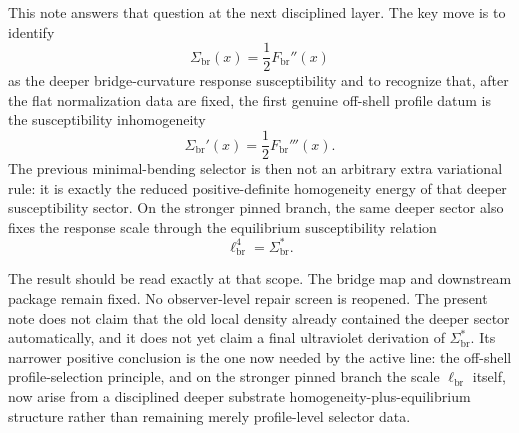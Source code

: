 \documentclass[11pt]{article}
\newcommand{\CurvScale}{\ell_{\mathrm{br}}}
\newcommand{\CurvProfile}{F_{\mathrm{br}}}
\newcommand{\RespSus}{\Sigma_{\mathrm{br}}}
\newcommand{\RespSusEq}{\Sigma_{\mathrm{br}}^{\ast}}
\begin{document}
This note answers that question at the next disciplined layer. The key move is to identify
\[
\RespSus(x)=\frac12\CurvProfile''(x)
\]
as the deeper bridge-curvature response susceptibility and to recognize that, after the flat normalization data are fixed, the first genuine off-shell profile datum is the susceptibility inhomogeneity
\[
\RespSus'(x)=\frac12\CurvProfile'''(x).
\]
The previous minimal-bending selector is then not an arbitrary extra variational rule: it is exactly the reduced positive-definite homogeneity energy of that deeper susceptibility sector. On the stronger pinned branch, the same deeper sector also fixes the response scale through the equilibrium susceptibility relation
\[
\CurvScale^4=\RespSusEq.
\]

The result should be read exactly at that scope. The bridge map and downstream package remain fixed. No observer-level repair screen is reopened. The present note does not claim that the old local density already contained the deeper sector automatically, and it does not yet claim a final ultraviolet derivation of \(\RespSusEq\). Its narrower positive conclusion is the one now needed by the active line: the off-shell profile-selection principle, and on the stronger pinned branch the scale \(\CurvScale\) itself, now arise from a disciplined deeper substrate homogeneity-plus-equilibrium structure rather than remaining merely profile-level selector data.
\end{document}
